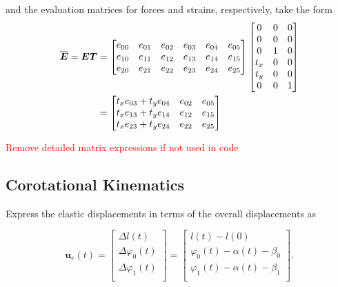 and the evaluation matrices for forces and strains, respectively, take the form
%
\begin{align}
\overline{\boldsymbol{E}} = \boldsymbol{E}\boldsymbol{T} &=
\begin{bmatrix}
e_{00} & e_{01} & e_{02} & e_{03} & e_{04} & e_{05} \\
e_{10} & e_{11} & e_{12} & e_{13} & e_{14} & e_{15} \\
e_{20} & e_{21} & e_{22} & e_{23} & e_{24} & e_{25} \\
\end{bmatrix}
\begin{bmatrix}
0 & 0 & 0 \\
0 & 0 & 0 \\
0 & 1 & 0 \\
t_x & 0 & 0 \\
t_y & 0 & 0 \\
0 & 0 & 1 \\
\end{bmatrix} \notag \\
&=
\begin{bmatrix}
t_x e_{03} + t_y e_{04} & e_{02} & e_{05} \\
t_x e_{13} + t_y e_{14} & e_{12} & e_{15} \\
t_x e_{23} + t_y e_{24} & e_{22} & e_{25} \\
\end{bmatrix}
\end{align}

\textcolor{red}{Remove detailed matrix expressions if not used in code}

\newpage
\subsection{Corotational Kinematics}

Express the elastic displacements in terms of the overall displacements as

\begin{equation}
\renewcommand\arraystretch{1.5}
\boldsymbol{u}_{e}(t) =
\begin{bmatrix}
\Delta l(t) \\
\Delta \varphi_0(t) \\
\Delta \varphi_1(t) \\ 
\end{bmatrix}
=
\begin{bmatrix}
l(t) - l(0) \\
\varphi_0(t) - \alpha(t) - \beta_0 \\
\varphi_1(t) - \alpha(t) - \beta_1 \\
\end{bmatrix}.
\end{equation}

